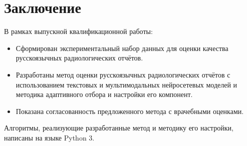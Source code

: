 
\section{Заключение}

В рамках выпускной квалификационной работы:

\begin{itemize}
    \item Сформирован экспериментальный набор данных для оценки качества русскоязычных радиологических отчётов.
    \item Разработаны метод оценки русскоязычных радиологических отчётов с использованием текстовых и мультимодальных нейросетевых моделей и методика адаптивного отбора и настройки его компонент.
    \item Показана согласованность предложенного метода с врачебными оценками.
\end{itemize}

Алгоритмы, реализующие разработанные метод и методику его настройки, написаны на языке Python 3.